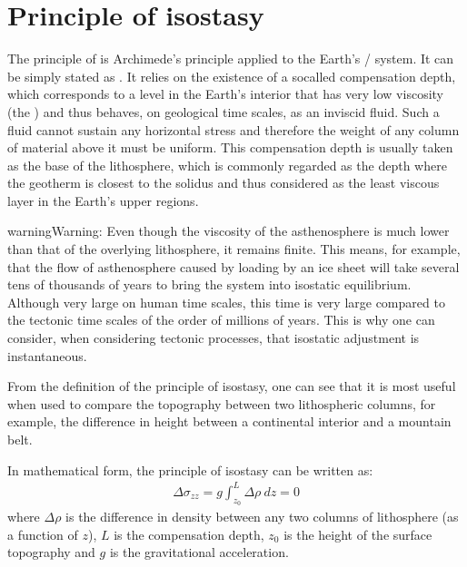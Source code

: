 \documentclass[letterpaper,10pt,english]{jupyterBook}
\begin{document}
\sphinxstepscope


\section{Principle of isostasy}
\label{\detokenize{isostasy:principle-of-isostasy}}\label{\detokenize{isostasy::doc}}
\sphinxAtStartPar
The principle of  is Archimede’s principle applied to the Earth’s / system. It can be simply stated as . It relies on the existence of a so\sphinxhyphen{}called compensation depth, which corresponds to a level in the Earth’s interior that has very low viscosity (the ) and thus behaves, on geological time scales, as an inviscid fluid. Such a fluid cannot sustain any horizontal stress and therefore the weight of any column of material above it must be uniform. This compensation depth is usually taken as the base of the lithosphere, which is commonly regarded as the depth where the geotherm is closest to the solidus and thus considered as the least viscous layer in the Earth’s upper regions.

\begin{sphinxadmonition}{warning}{Warning:}
\sphinxAtStartPar
Even though the viscosity of the asthenosphere is much lower than that of the overlying lithosphere, it remains finite. This means, for example, that the flow of asthenosphere caused by loading by an ice sheet will take several tens of thousands of years to bring the system into isostatic equilibrium. Although very large on human time scales, this time is very large compared to the tectonic time scales of the order of millions of years. This is why one can consider, when considering tectonic processes, that isostatic adjustment is instantaneous.
\end{sphinxadmonition}

\sphinxAtStartPar
From the definition of the principle of isostasy, one can see that it is most useful when used to compare the topography between two lithospheric columns, for example, the difference in height between a continental interior and a mountain belt.

\sphinxAtStartPar
In mathematical form, the principle of isostasy can be written as:
\begin{equation*}
\begin{split}\Delta \sigma_{zz}=g\int_{z_0}^L\Delta\rho\ dz=0\end{split}
\end{equation*}
\sphinxAtStartPar
where \(\Delta\rho\) is the difference in density between any two columns of lithosphere (as a function of \(z\)), \(L\) is the compensation depth, \(z_0\) is the height of the surface topography and \(g\) is the gravitational acceleration.
\end{document}
